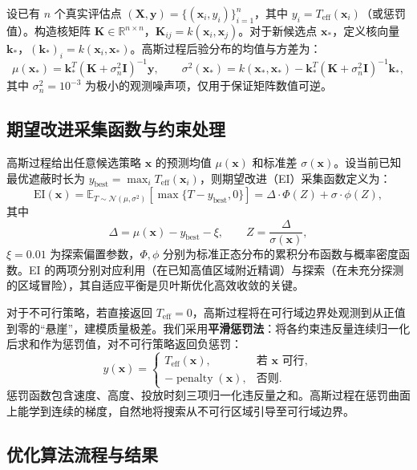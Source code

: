 \documentclass{ctexart}
\begin{document}
设已有 $n$ 个真实评估点 $(\mathbf{X}, \mathbf{y}) = \{(\mathbf{x}_i, y_i)\}_{i=1}^n$，其中 $y_i = T_{\text{eff}}(\mathbf{x}_i)$（或惩罚值）。构造核矩阵 $\mathbf{K} \in \mathbb{R}^{n\times n}$，$\mathbf{K}_{ij}=k(\mathbf{x}_i,\mathbf{x}_j)$。对于新候选点 $\mathbf{x}_*$，定义核向量 $\mathbf{k}_*$，$(\mathbf{k}_*)_i=k(\mathbf{x}_i,\mathbf{x}_*)$。高斯过程后验分布的均值与方差为：
\[
\mu(\mathbf{x}_*) = \mathbf{k}_*^T (\mathbf{K} + \sigma_n^2 \mathbf{I})^{-1} \mathbf{y}, \qquad
\sigma^2(\mathbf{x}_*) = k(\mathbf{x}_*, \mathbf{x}_*) - \mathbf{k}_*^T (\mathbf{K} + \sigma_n^2 \mathbf{I})^{-1} \mathbf{k}_*, \label{eq:posterior}
\]
其中 $\sigma_n^2 = 10^{-3}$ 为极小的观测噪声项，仅用于保证矩阵数值可逆。

\subsection{期望改进采集函数与约束处理}

高斯过程给出任意候选策略 $\mathbf{x}$ 的预测均值 $\mu(\mathbf{x})$ 和标准差 $\sigma(\mathbf{x})$。设当前已知最优遮蔽时长为 $y_{\text{best}} = \max_i T_{\text{eff}}(\mathbf{x}_i)$，则期望改进（EI）采集函数定义为：
\[
\mathrm{EI}(\mathbf{x}) = \mathbb{E}_{T \sim \mathcal{N}(\mu, \sigma^2)}[\max\{T - y_{\text{best}}, 0\}] = \Delta \cdot \Phi(Z) + \sigma \cdot \phi(Z), \label{eq:ei}
\]
其中
\[
\Delta = \mu(\mathbf{x}) - y_{\text{best}} - \xi, \qquad Z = \frac{\Delta}{\sigma(\mathbf{x})},
\]
$\xi = 0.01$ 为探索偏置参数，$\Phi,\phi$ 分别为标准正态分布的累积分布函数与概率密度函数。EI 的两项分别对应利用（在已知高值区域附近精调）与探索（在未充分探测的区域冒险），其自适应平衡是贝叶斯优化高效收敛的关键。

对于不可行策略，若直接返回 $T_{\text{eff}}=0$，高斯过程将在可行域边界处观测到从正值到零的“悬崖”，建模质量极差。我们采用\textbf{平滑惩罚法}：将各约束违反量连续归一化后求和作为惩罚值，对不可行策略返回负惩罚：
\[
y(\mathbf{x}) = \begin{cases}
T_{\text{eff}}(\mathbf{x}), & \text{若 } \mathbf{x} \text{ 可行}, \\[6pt]
-\operatorname{penalty}(\mathbf{x}), & \text{否则}.
\end{cases}
\]
惩罚函数包含速度、高度、投放时刻三项归一化违反量之和。高斯过程在惩罚曲面上能学到连续的梯度，自然地将搜索从不可行区域引导至可行域边界。

\subsection{优化算法流程与结果}
\end{document}
